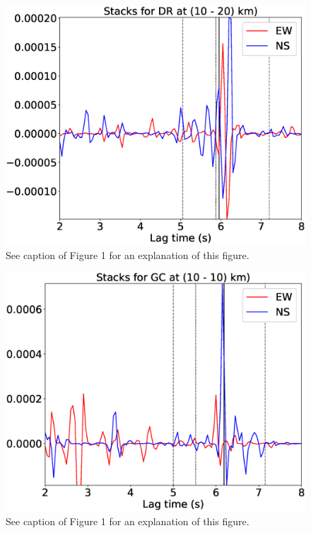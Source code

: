 \documentclass[letterpaper, 12pt]{article}
\begin{document}
\begin{figure}[H]
\includegraphics[width=\linewidth]{figures/intervals/DR_010_020_stacks.eps}
\caption{See caption of Figure 1 for an explanation of this figure.}
\end{figure}

\begin{figure}[H]
\includegraphics[width=\linewidth]{figures/intervals/GC_010_010_stacks.eps}
\caption{See caption of Figure 1 for an explanation of this figure.}
\end{figure}
\end{document}
